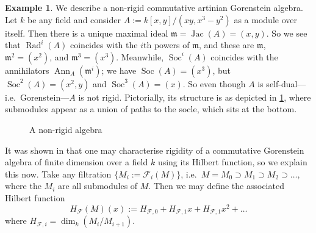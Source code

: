 \documentclass[11pt,reqno]{amsart}
\theoremstyle{definition}
\newtheorem{example}[lemma]{Example}
\theoremstyle{remark}
\theoremstyle{definition}
\theoremstyle{plain}
\DeclareMathOperator{\Rad}{Rad}
\DeclareMathOperator{\Soc}{Soc}
\DeclareMathOperator{\Ann}{Ann}
\DeclareMathOperator{\Jac}{Jac}
\newcommand{\m}{\mathfrak{m}}
\begin{document}
\begin{example}\label{rem:rigidegs}
We describe a non-rigid commutative artinian Gorenstein algebra. Let $k$ be any field and consider $A:=k[x,y]/(xy,x^3-y^2)$ as a module over itself. Then there is a unique maximal ideal $\m=\Jac(A)=(x,y)$.
So we see that $\Rad^i(A)$ coincides with the $i$th powers of $\m$, and these are $\m$, $\m^2=(x^2)$, and $\m^3=(x^3)$. 
Meanwhile, $\Soc^i(A)$ coincides with the annihilators $\Ann_A(\m^i)$; we have $\Soc(A)=(x^3)$, but $\Soc^2(A)=(x^2,y)$ and $\Soc^3(A)=(x)$. So even though $A$ is self-dual---i.e.~Gorenstein---$A$ is not rigid. Pictorially, its structure is as depicted in \cref{nonrigpic}, where submodules appear as a union of paths to the socle, which sits at the bottom. 

\begin{figure}\begin{center}\end{center}\caption{A non-rigid algebra}\label{nonrigpic}\end{figure}
\end{example}

It was shown in \cite[\S70]{Mac} that one may characterise rigidity of a commutative Gorenstein  algebra of finite dimension over a field $k$ using its Hilbert function, so we explain this now. Take any filtration $\{M_i:=\mathscr{F}_i(M)\}$, i.e.~$M=M_0\supset M_1 \supset M_2 \supset \dots$, where the $M_i$ are all submodules of $M$. Then we may define the associated Hilbert function 
\[H_{\mathscr{F}}(M)(x):=H_{\mathscr{F},0}+H_{\mathscr{F},1}x+H_{\mathscr{F},1}x^2+\dots\] where $H_{\mathscr{F},i}=\dim_k(M_i/M_{i+1})$. 
\end{document}

